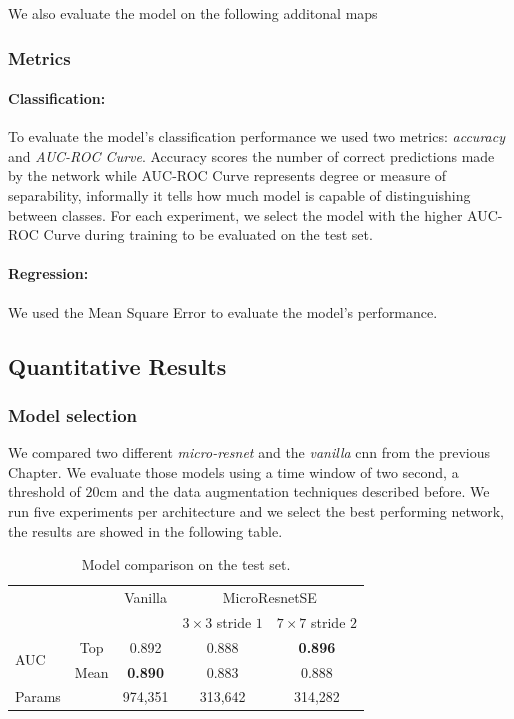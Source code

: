 \documentclass[../document.tex]{subfiles}
\begin{document}
We also evaluate the model on the following additonal maps
\subsubsection{Metrics}

\paragraph{Classification:} To evaluate the model's classification performance we used two metrics: \emph{accuracy} and \emph{AUC-ROC Curve}. Accuracy scores the number of correct predictions made by the network while AUC-ROC Curve represents degree or measure of separability, informally it tells how much model is capable of distinguishing between classes. For each experiment, we select the model with the higher AUC-ROC Curve during training to be evaluated on the test set.



\paragraph{Regression:} We used the Mean Square Error to evaluate the model's performance.
\subsection{Quantitative Results}
\subsubsection{Model selection}
We compared two different \emph{micro-resnet} and the \emph{vanilla} cnn from the previous Chapter. We evaluate those models using a time window of two second, a threshold of $20$cm and the data augmentation techniques described before. We run five experiments per architecture and we select the best performing network, the results are showed in the following table. 

\begin{table}[h]
  \centering
  \begin{tabular}{@{}lcccc@{}}
  \toprule
   && Vanilla & \multicolumn{2}{c}{MicroResnetSE} \\
  \cline{3-5}
  && & $3\times 3$ stride $1$ & $7\times7$ stride $2$\\ 
  \cline{3-5}
  \multirow{2}{*}{AUC} & Top & 0.892 & 0.888 & \textbf{0.896}\\
   & Mean & \textbf{0.890} & 0.883 & 0.888\\
  \cline{1-5}
  Params & & 974,351 & 313,642 & 314,282  \\
  \bottomrule   
\end{tabular}
\caption{Model comparison on the test set.}
\end{table}
\end{document}
